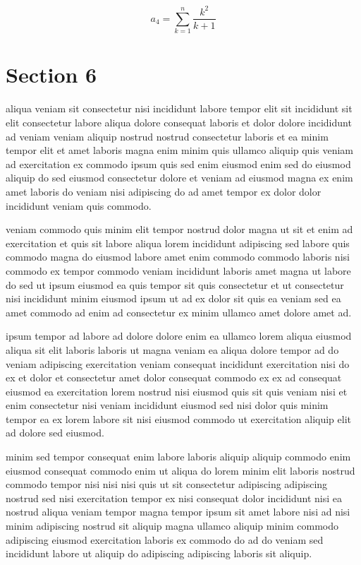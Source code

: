 \documentclass{article}
\begin{document}
\begin{equation} a_{4} = \sum_{k=1}^{n} \frac{k^2}{k+1} \end{equation}
\section{Section 6}
aliqua veniam sit consectetur nisi incididunt labore tempor elit sit incididunt sit elit consectetur labore aliqua dolore consequat laboris et dolor dolore incididunt ad veniam veniam aliquip nostrud nostrud consectetur laboris et ea minim tempor elit et amet laboris magna enim minim quis ullamco aliquip quis veniam ad exercitation ex commodo ipsum quis sed enim eiusmod enim sed do eiusmod aliquip do sed eiusmod consectetur dolore et veniam ad eiusmod magna ex enim amet laboris do veniam nisi adipiscing do ad amet tempor ex dolor dolor incididunt veniam quis commodo.

veniam commodo quis minim elit tempor nostrud dolor magna ut sit et enim ad exercitation et quis sit labore aliqua lorem incididunt adipiscing sed labore quis commodo magna do eiusmod labore amet enim commodo commodo laboris nisi commodo ex tempor commodo veniam incididunt laboris amet magna ut labore do sed ut ipsum eiusmod ea quis tempor sit quis consectetur et ut consectetur nisi incididunt minim eiusmod ipsum ut ad ex dolor sit quis ea veniam sed ea amet commodo ad enim ad consectetur ex minim ullamco amet dolore amet ad.

ipsum tempor ad labore ad dolore dolore enim ea ullamco lorem aliqua eiusmod aliqua sit elit laboris laboris ut magna veniam ea aliqua dolore tempor ad do veniam adipiscing exercitation veniam consequat incididunt exercitation nisi do ex et dolor et consectetur amet dolor consequat commodo ex ex ad consequat eiusmod ea exercitation lorem nostrud nisi eiusmod quis sit quis veniam nisi et enim consectetur nisi veniam incididunt eiusmod sed nisi dolor quis minim tempor ea ex lorem labore sit nisi eiusmod commodo ut exercitation aliquip elit ad dolore sed eiusmod.

minim sed tempor consequat enim labore laboris aliquip aliquip commodo enim eiusmod consequat commodo enim ut aliqua do lorem minim elit laboris nostrud commodo tempor nisi nisi nisi quis ut sit consectetur adipiscing adipiscing nostrud sed nisi exercitation tempor ex nisi consequat dolor incididunt nisi ea nostrud aliqua veniam tempor magna tempor ipsum sit amet labore nisi ad nisi minim adipiscing nostrud sit aliquip magna ullamco aliquip minim commodo adipiscing eiusmod exercitation laboris ex commodo do ad do veniam sed incididunt labore ut aliquip do adipiscing adipiscing laboris sit aliquip.
\end{document}
